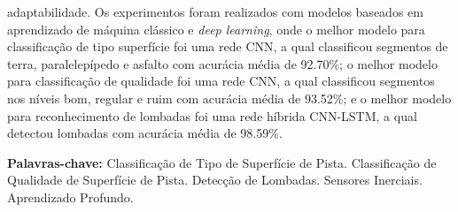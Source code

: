 \begin{resumo}[Resumo]
adaptabilidade. Os experimentos foram realizados com modelos baseados em aprendizado de máquina clássico e \textit{deep learning}, onde o melhor modelo para classificação de tipo superfície foi uma rede CNN, a qual classificou segmentos de terra, paralelepípedo e asfalto com acurácia média de 92.70\%; o melhor modelo para classificação de qualidade foi uma rede CNN, a qual classificou segmentos nos níveis bom, regular e ruim com acurácia média de 93.52\%; e o melhor modelo para reconhecimento de lombadas foi uma rede híbrida CNN-LSTM, a qual detectou lombadas com acurácia média de 98.59\%.
    
  \vspace{\baselineskip} 
  \textbf{Palavras-chave:} 
  Classificação de Tipo de Superfície de Pista.
  Classificação de Qualidade de Superfície de Pista.
  Detecção de Lombadas.
  Sensores Inerciais. 
  Aprendizado Profundo.
  
\end{resumo}
